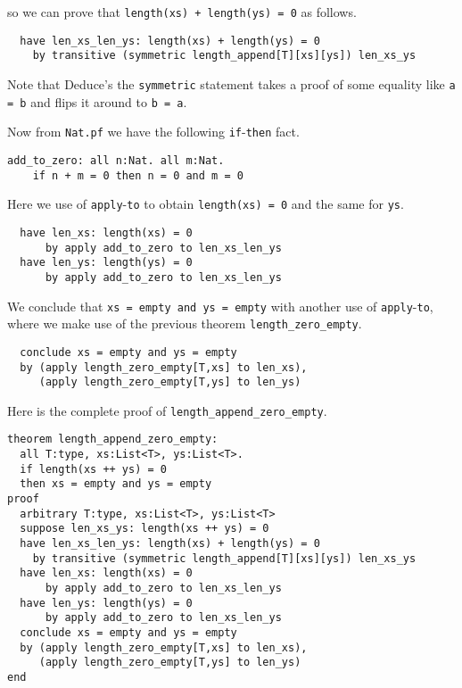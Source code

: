 \documentclass[12pt]{article}
\begin{document}
\noindent so we can prove that \texttt{length(xs) + length(ys) = 0} as
follows.

\begin{verbatim}
  have len_xs_len_ys: length(xs) + length(ys) = 0
    by transitive (symmetric length_append[T][xs][ys]) len_xs_ys
\end{verbatim}

\noindent Note that Deduce's the \texttt{symmetric} statement takes a
proof of some equality like \texttt{a = b} and flips it around to
\texttt{b = a}.

Now from \texttt{Nat.pf} we have the following \texttt{if}-\texttt{then} fact.

\begin{verbatim}
add_to_zero: all n:Nat. all m:Nat. 
    if n + m = 0 then n = 0 and m = 0
\end{verbatim}

\noindent Here we use of \texttt{apply}-\texttt{to} to obtain
\texttt{length(xs) = 0} and the same for \texttt{ys}.

\begin{verbatim}
  have len_xs: length(xs) = 0
      by apply add_to_zero to len_xs_len_ys
  have len_ys: length(ys) = 0
      by apply add_to_zero to len_xs_len_ys
\end{verbatim}

We conclude that \texttt{xs = empty and ys = empty} with another use
of \texttt{apply}-\texttt{to}, where we make use of the previous
theorem \texttt{length\_zero\_empty}.

\begin{verbatim}
  conclude xs = empty and ys = empty
  by (apply length_zero_empty[T,xs] to len_xs),
     (apply length_zero_empty[T,ys] to len_ys)
\end{verbatim}

Here is the complete proof of \texttt{length\_append\_zero\_empty}.

\begin{verbatim}
theorem length_append_zero_empty: 
  all T:type, xs:List<T>, ys:List<T>.
  if length(xs ++ ys) = 0
  then xs = empty and ys = empty
proof
  arbitrary T:type, xs:List<T>, ys:List<T>
  suppose len_xs_ys: length(xs ++ ys) = 0
  have len_xs_len_ys: length(xs) + length(ys) = 0
    by transitive (symmetric length_append[T][xs][ys]) len_xs_ys
  have len_xs: length(xs) = 0
      by apply add_to_zero to len_xs_len_ys
  have len_ys: length(ys) = 0
      by apply add_to_zero to len_xs_len_ys
  conclude xs = empty and ys = empty
  by (apply length_zero_empty[T,xs] to len_xs),
     (apply length_zero_empty[T,ys] to len_ys)
end
\end{verbatim}
\end{document}
